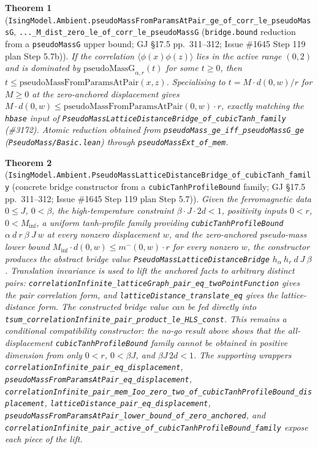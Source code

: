 \documentclass[a4paper,11pt]{article}
\newtheorem{theorem}{Theorem}
\begin{document}
\begin{theorem}[\texttt{IsingModel.Ambient.pseudoMassFromParamsAtPair\_ge\_of\_corr\_le\_pseudoMassG},
\texttt{...\_M\_dist\_zero\_le\_of\_corr\_le\_pseudoMassG}
(\texttt{bridge.bound} reduction from a \texttt{pseudoMassG} upper bound;
GJ \S17.5 pp.~311--312; Issue \#1645 Step 119 plan Step 5.7b)]
If the correlation $\langle\phi(x)\phi(z)\rangle$ lies in the active range
$(0, 2)$ and is dominated by $\mathrm{pseudoMassG}_{\alpha,r}(t)$ for some
$t \ge 0$, then $t \le \mathrm{pseudoMassFromParamsAtPair}(x, z)$. Specialising
to $t = M \cdot d(0, w) / r$ for $M \ge 0$ at the zero-anchored displacement
gives $M \cdot d(0, w) \le \mathrm{pseudoMassFromParamsAtPair}(0, w) \cdot r$,
exactly matching the \texttt{hbase} input of
\texttt{PseudoMassLatticeDistanceBridge\_of\_cubicTanh\_family}
(\#3172). Atomic reduction obtained from
\texttt{pseudoMass\_ge\_iff\_pseudoMassG\_ge} (\texttt{PseudoMass/Basic.lean})
through \texttt{pseudoMassExt\_of\_mem}.
\end{theorem}

\begin{theorem}[\texttt{IsingModel.Ambient.PseudoMassLatticeDistanceBridge\_of\_cubicTanh\_family}
(concrete bridge constructor from a \texttt{cubicTanhProfileBound} family;
GJ \S17.5 pp.~311--312; Issue \#1645 Step 119 plan Step 5.7)]
Given the ferromagnetic data $0 \le J$, $0 < \beta$, the high-temperature
constraint $\beta\cdot J\cdot 2d < 1$, positivity inputs $0 < r$, $0 < M_{\inf}$,
a uniform tanh-profile family providing
\texttt{cubicTanhProfileBound} $\alpha\ d\ r\ \beta\ J\ w$ at every nonzero
displacement $w$, and the zero-anchored pseudo-mass lower bound
$M_{\inf}\cdot d(0, w) \le m^-(0, w)\cdot r$ for every nonzero $w$, the
constructor produces the abstract bridge value
\texttt{PseudoMassLatticeDistanceBridge} $h_\alpha\ h_r\ d\ J\ \beta$.
Translation invariance is used to lift the anchored facts to arbitrary distinct
pairs: \texttt{correlationInfinite\_latticeGraph\_pair\_eq\_twoPointFunction}
gives the pair correlation form, and \texttt{latticeDistance\_translate\_eq}
gives the lattice-distance form. The constructed bridge value can be fed
directly into \texttt{tsum\_correlationInfinite\_pair\_product\_le\_HLS\_const}.
This remains a conditional compatibility constructor: the no-go result above
shows that the all-displacement \texttt{cubicTanhProfileBound} family cannot be
obtained in positive dimension from only \(0<r\), \(0<\beta J\), and
\(\beta J\,2d<1\).
The supporting wrappers
\texttt{correlationInfinite\_pair\_eq\_displacement},
\texttt{pseudoMassFromParamsAtPair\_eq\_displacement},
\texttt{correlationInfinite\_pair\_mem\_Ioo\_zero\_two\_of\_cubicTanhProfileBound\_displacement},
\texttt{latticeDistance\_pair\_eq\_displacement},
\texttt{pseudoMassFromParamsAtPair\_lower\_bound\_of\_zero\_anchored}, and
\texttt{correlationInfinite\_pair\_active\_of\_cubicTanhProfileBound\_family}
expose each piece of the lift.
\end{theorem}
\end{document}
